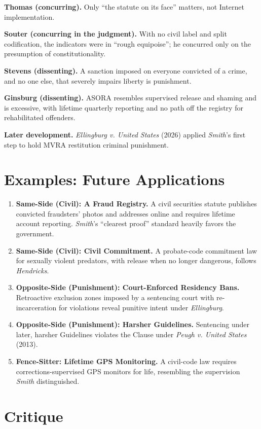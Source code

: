 \documentclass[12pt]{article}
\begin{document}
\textbf{Thomas (concurring).} Only ``the statute on its face'' matters, not Internet implementation.

\textbf{Souter (concurring in the judgment).} With no civil label and split codification, the indicators were in ``rough equipoise''; he concurred only on the presumption of constitutionality.

\textbf{Stevens (dissenting).} A sanction imposed on everyone convicted of a crime, and no one else, that severely impairs liberty is punishment.

\textbf{Ginsburg (dissenting).} ASORA resembles supervised release and shaming and is excessive, with lifetime quarterly reporting and no path off the registry for rehabilitated offenders.

\textbf{Later development.} \textit{Ellingburg v. United States} (2026) applied \textit{Smith}'s first step to hold MVRA restitution criminal punishment.

\section{Examples: Future Applications}

\begin{enumerate}
\item \textbf{Same-Side (Civil): A Fraud Registry.} A civil securities statute publishes convicted fraudsters' photos and addresses online and requires lifetime account reporting. \textit{Smith}'s ``clearest proof'' standard heavily favors the government.
\item \textbf{Same-Side (Civil): Civil Commitment.} A probate-code commitment law for sexually violent predators, with release when no longer dangerous, follows \textit{Hendricks}.
\item \textbf{Opposite-Side (Punishment): Court-Enforced Residency Bans.} Retroactive exclusion zones imposed by a sentencing court with re-incarceration for violations reveal punitive intent under \textit{Ellingburg}.
\item \textbf{Opposite-Side (Punishment): Harsher Guidelines.} Sentencing under later, harsher Guidelines violates the Clause under \textit{Peugh v. United States} (2013).
\item \textbf{Fence-Sitter: Lifetime GPS Monitoring.} A civil-code law requires corrections-supervised GPS monitors for life, resembling the supervision \textit{Smith} distinguished.
\end{enumerate}

\section{Critique}
\end{document}
